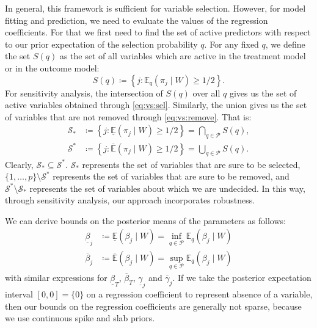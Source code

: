 \documentclass[preprint,12pt]{elsarticle}
\newcommand{\lexp}{\underline{\mathbb{E}}}
\newcommand{\uexp}{\overline{\mathbb{E}}}
\begin{document}
In general, this framework is
sufficient
for variable selection. However, for
model fitting and prediction, we need to evaluate the values 
of the regression coefficients. For that we first need to find the set of active
predictors with respect to our prior expectation of the selection probability $q$.
For any fixed $q$, we define the set $S(q)$ as the set of all variables which are active
in the treatment model or in the outcome model:
\begin{equation}
	S(q)\coloneqq
	\left\{j\colon \mathbb{E}_q(\pi_j\mid W) \ge 1/2\right\}.
\end{equation}
For sensitivity analysis,
the intersection of $S(q)$ over all $q$ gives us the set of
active variables obtained through \cref{eq:vs:sel}.
Similarly, the union gives us the set of
variables that are not removed through \cref{eq:vs:remove}.
That is:
\begin{align}
    \mathcal{S}_*&\coloneqq \left\{j:\lexp (\pi_j\mid W)\ge1/2\right\}
    = \bigcap_{q\in \mathcal{P}}S(q), \\
    \mathcal{S}^*&\coloneqq \left\{j:\uexp (\pi_j\mid W)\ge1/2\right\}
    = \bigcup_{q\in \mathcal{P}}S(q).
\end{align}
Clearly, $\mathcal{S}_*\subseteq\mathcal{S}^*$.
$\mathcal{S}_*$ represents the set of variables that are sure to be selected,
$\{1,\dots,p\}\setminus\mathcal{S}^*$ represents the set of variables that are sure to be removed, and
$\mathcal{S}^*\setminus\mathcal{S}_*$ represents the set of variables about which we are undecided.
In this way, through sensitivity analysis, our approach incorporates robustness.

We can derive bounds on the posterior means of the parameters as follows:
\begin{align}
\label{eq:beta:lower}
\underline{\beta}_j&\coloneqq\lexp (\beta_j\mid W)= \inf_{q\in \mathcal{P}} \mathbb{E}_q(\beta_j\mid W) \\
\label{eq:beta:upper}
\overline{\beta}_j&\coloneqq\uexp (\beta_j\mid W)=\sup_{q\in \mathcal{P}} \mathbb{E}_q(\beta_j\mid W)
\end{align}
with similar expressions for 
$\underline{\beta}_T$, $\overline{\beta}_T$,
$\underline{\gamma}_j$ and $\overline{\gamma}_j$.
If we take the posterior expectation interval $[0,0]=\{0\}$ on a regression coefficient to represent absence of a variable, then our bounds on the regression coefficients are generally not sparse, because we use continuous 
spike and slab priors.
\end{document}
